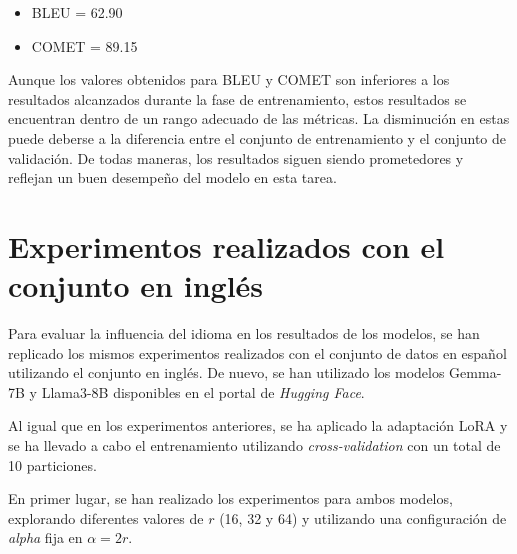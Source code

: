 \documentclass[11pt,spanish,listoffigures,listoftables]{tfgetsinf}
\begin{document}
\begin{itemize}
	\item BLEU = 62.90
	\item COMET = 89.15
\end{itemize}

Aunque los valores obtenidos para BLEU y COMET son inferiores a los resultados alcanzados durante la fase de entrenamiento, estos resultados se encuentran dentro de un rango adecuado de las métricas. La disminución en estas puede deberse a la diferencia entre el conjunto de entrenamiento y el conjunto de validación. De todas maneras, los resultados siguen siendo prometedores y reflejan un buen desempeño del modelo en esta tarea.

\section{Experimentos realizados con el conjunto en inglés}

Para evaluar la influencia del idioma en los resultados de los modelos, se han replicado los mismos experimentos realizados con el conjunto de datos en español utilizando el conjunto en inglés. De nuevo, se han utilizado los modelos Gemma-7B y Llama3-8B disponibles en el portal de \textit{Hugging Face}.

Al igual que en los experimentos anteriores, se ha aplicado la adaptación LoRA y se ha llevado a cabo el entrenamiento utilizando \textit{cross-validation} con un total de 10 particiones.

En primer lugar, se han realizado los experimentos para ambos modelos, explorando diferentes valores de $r$ (16, 32 y 64) y utilizando una configuración de \textit{alpha} fija en $\alpha = 2r$.




\end{document}
